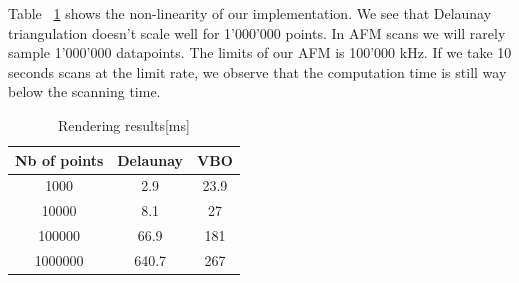 Table  ~\ref{table:nonlin} shows the non-linearity of our implementation. We see that Delaunay triangulation doesn't scale well for 1'000'000 points. In AFM scans we will rarely sample 1'000'000 datapoints. The limits of our AFM is 100'000 kHz. If we take 10 seconds scans at the limit rate, we observe that the computation time is still way below the scanning time. 

\begin{table}[ht]
\caption{Rendering results[ms]} %
\centering %
\begin{tabular}{c c c} %
\hline\hline %
 Nb of points & Delaunay & VBO \\ [0.5ex] %
\hline %

1000 & 2.9 & 23.9 \\
10000 & 8.1	&	27 	\\
100000 & 66.9 & 181 \\
1000000 & 640.7	& 267 \\[1ex]


\hline %
\end{tabular}
\label{table:nonlin} %
\end{table}


